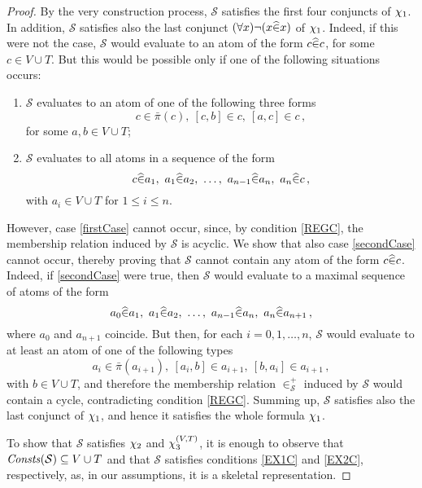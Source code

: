 \documentclass[manyauthors]{fundam}
\newcommand{\memclosure}[1]{\in_{#1}^{+}}
\newcommand{\pairin}[3]{\left[#1,#2\right] \in #3}
\newcommand{\nonpairin}[2]{#1 \in \bar{\pi}(#2)}
\newcommand{\atset}{\mathcal{S}}
\newcommand{\consta}{a}
\newcommand{\constb}{b}
\newcommand{\constc}{c}
\begin{document}
\begin{proof}
By the very construction process, $\atset$ satisfies the first four
conjuncts of $\chi_1$.  In addition, $\atset$ satisfies also the last
conjunct $(\forall x)\neg(x \widehat{\in} x)$ of $\chi_1$.  Indeed, if this
were not the case, $\atset$ would evaluate to \true an atom of the form
$\memhat{\constc}{\constc}$, for some $\constc \in V \cup T$.  But 
this would be
possible only if one of the following situations occurs:
\begin{enumerate}[label={(\alph*)}]
\item\label{firstCase} $\atset$ evaluates to \true an atom of one of the
following three forms
\[
\nonpairin{\constc}{\constc},~ \pairin{\constc}{\constb}{\constc},~
\pairin{\consta}{\constc}{\constc}\,,
\]
for some $\consta,\constb \in V \cup T$;

\item\label{secondCase} $\atset$ evaluates to \true all atoms in a 
sequence of the form
\[
\memhat{\constc}{\consta_{1}},~\memhat{\consta_{1}}{\consta_{2}},~ \ldots,~
\memhat{\consta_{n-1}}{\consta_{n}},~\memhat{\consta_{n}}{\constc}\,,
\]
with $\consta_{i} \in V \cup T$ for $1 \leq i \leq n$.
\end{enumerate}
However, case \ref{firstCase} cannot occur, since, by condition
\ref{REGC}, the membership relation induced by $\atset$ is acyclic.
We show that also case \ref{secondCase} cannot occur, thereby proving
that $\atset$ cannot contain any atom of the form $\memhat{\constc}{\constc}$.
Indeed, if \ref{secondCase} were true, then $\atset$ would evaluate to \true a
maximal sequence of atoms of the form
\[
\memhat{\consta_{0}}{\consta_{1}},~\memhat{\consta_{1}}{\consta_{2}},~ \ldots,~
\memhat{\consta_{n-1}}{\consta_{n}},~\memhat{\consta_{n}}{\consta_{n+1}}\,,
\]
where $\consta_{0}$ and $\consta_{n+1}$ coincide. But then, for each
$i=0,1,\ldots,n$, $\atset$ would evaluate to \true at least an atom of one of
the following types
\[
\nonpairin{\consta_i}{\consta_{i+1}},~ 
\pairin{\consta_{i}}{\constb}{\consta_{i+1}},~
\pairin{\constb}{\consta_{i}}{\consta_{i+1}}\,,
\]
with $\constb \in V \cup T$, and therefore the membership relation
$\memclosure{\atset}$ induced by $\atset$ would contain a cycle,
contradicting condition \ref{REGC}.
%
Summing up, $\atset$ satisfies also the last conjunct of $\chi_1$,
and hence it satisfies the whole formula $\chi_1$.

To show that $\atset$ satisfies $\chi_2$ and $\chi_3^{(V,T)}$, it is enough
to observe that $\Consts(\atset)\subseteq V \cup T$ and that $\atset$ satisfies
conditions \ref{EX1C} and \ref{EX2C}, respectively, as, in our assumptions,
it is a skeletal representation.


\end{proof}
\end{document}
